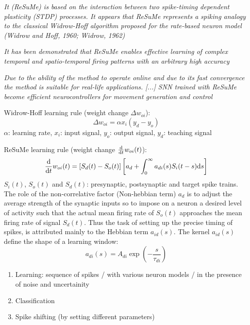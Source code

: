 \documentclass[12pt]{article}
\begin{document}
\textit{It (ReSuMe) is based on the interaction between two spike-timing dependent plasticity (STDP) processes. It appears that ReSuMe represents a spiking analogy to the classical Widrow-Hoff algorithm proposed for the rate-based neuron model (Widrow and Hoff, 1960; Widrow, 1962)}

\textit{It has been demonstrated that ReSuMe enables effective learning of complex temporal and spatio-temporal firing patterns with an arbitrary high accuracy}

\textit{Due to the ability of the method to operate online and due to its fast convergence the method is suitable for real-life applications. [...] SNN trained with ReSuMe become efficient neurocontrollers for movement generation and control}

Widrow-Hoff learning rule (weight change $\Delta w_{oi}$): \begin{equation}
\Delta w_{oi} = \alpha x_i(y_d-y_o)
\end{equation}
$\alpha$: learning rate, $x_i$: input signal, $y_o$: output signal, $y_d$: teaching signal

ReSuMe learning rule (weight change $\frac{\textnormal{d}}{\textnormal{d}t} w_{oi}(t)$): \begin{equation}
\frac{\textnormal{d}}{\textnormal{d}t} w_{oi}(t) = \left[ S_d(t) - S_o(t) \right] \left[ a_d + \int_0^\infty a_{di}(s) S_i(t-s) \textnormal{d}s \right]
\end{equation}
$S_i(t)$, $S_o(t)$ and $S_d(t)$: presynaptic, postsynaptic and target spike trains. The role of the non-correlative factor (Non-hebbian term) $a_d$ is to adjust the average strength of the synaptic inputs so to impose on a neuron a desired level of activity such that the actual mean firing rate of $S_o(t)$ approaches the mean firing rate of signal $S_d(t)$. Thus the task of setting up the precise timing of spikes, is attributed mainly to the Hebbian term $a_{id}(s)$. The kernel $a_{id}(s)$ define the shape of a learning window: \begin{equation}
a_{di}(s) = A_{di} \exp (-\frac{s}{\tau_{di}})
\end{equation}

\begin{enumerate}
\item Learning: sequence of spikes / with various neuron models / in the presence of noise and uncertainity
\item Classification
\item Spike shifting (by setting different parameters)
\end{enumerate}
\end{document}
